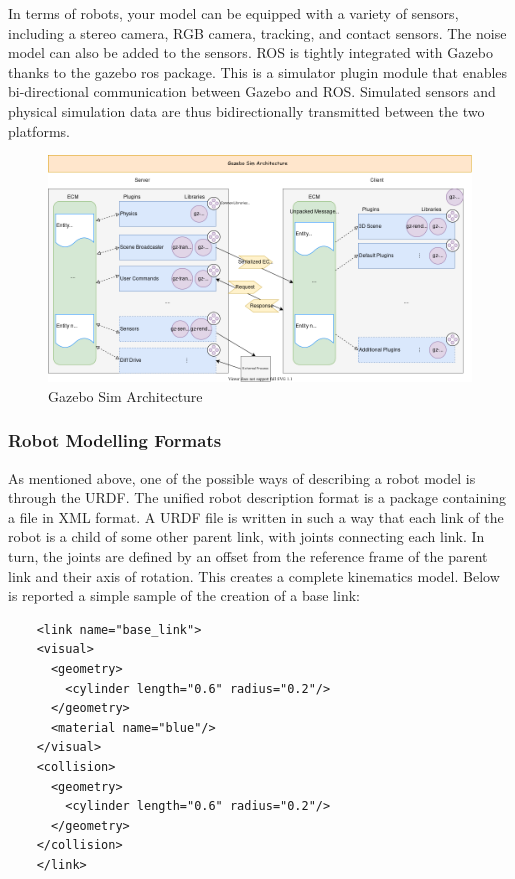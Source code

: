 In terms of robots, your model can be equipped with a variety of sensors, including a stereo camera, RGB camera, tracking, and contact sensors. The noise model can also be added to the sensors.
ROS is tightly integrated with Gazebo thanks to the gazebo ros package. This is a simulator plugin module that enables bi-directional communication between Gazebo and ROS.
Simulated sensors and physical simulation data are thus bidirectionally transmitted between the two platforms.
 \begin{figure}[H]
     \centering
     \includegraphics[scale=0.40]{Images/Chapter 2/GazeboSimArchitecture.png}
     \caption{Gazebo Sim Architecture}
     \label{fig:gazebosimarch}
 \end{figure}
 
\subsubsection{Robot Modelling Formats}
As mentioned above, one of the possible ways of describing a robot model is through the URDF.
The unified robot description format is a package containing a file in XML format.
A URDF file is written in such a way that each link of the robot is a child of some other parent link, with joints connecting each link. In turn, the joints are defined by an offset from the reference frame of the parent link and their axis of rotation. 
This creates a complete kinematics model. 
Below is reported a simple sample of the creation of a base link:
\begin{verbatim}
    <link name="base_link">
    <visual>
      <geometry>
        <cylinder length="0.6" radius="0.2"/>
      </geometry>
      <material name="blue"/>
    </visual>
    <collision>
      <geometry>
        <cylinder length="0.6" radius="0.2"/>
      </geometry>
    </collision>
    </link>
\end{verbatim}

